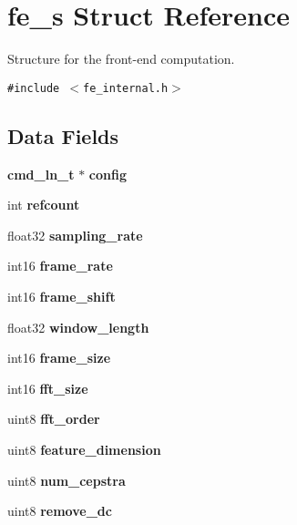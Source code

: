 \section{fe\_\-s Struct Reference}
\label{structfe__s}
Structure for the front-end computation.  


{\tt \#include $<$fe\_\-internal.h$>$}

\subsection*{Data Fields}
\begin{CompactItemize}
\item 
{\bf cmd\_\-ln\_\-t} $\ast$ \textbf{config}\label{structfe__s_be27cd07861a2f0042f5a83f3371d0fb}

\item 
int \textbf{refcount}\label{structfe__s_4cdf2f8b372cfddb38a48dd770450af9}

\item 
float32 \textbf{sampling\_\-rate}\label{structfe__s_f79879861c60083c1c0135c380bfe8e2}

\item 
int16 \textbf{frame\_\-rate}\label{structfe__s_23ca679cec8c0643dd1fa32b4e925f00}

\item 
int16 \textbf{frame\_\-shift}\label{structfe__s_62b189505f084007c3799faf3836b118}

\item 
float32 \textbf{window\_\-length}\label{structfe__s_e652f41503dd7b853bff8de89340703d}

\item 
int16 \textbf{frame\_\-size}\label{structfe__s_72b5838a48f3a10c8ba3917d245093d0}

\item 
int16 \textbf{fft\_\-size}\label{structfe__s_466b997c1f544043fb3ab6f2f89e97e7}

\item 
uint8 \textbf{fft\_\-order}\label{structfe__s_3783552280c06207510cbe576a76d1d9}

\item 
uint8 \textbf{feature\_\-dimension}\label{structfe__s_9c876fb2d9be5f3acaad06ddebcdc4fe}

\item 
uint8 \textbf{num\_\-cepstra}\label{structfe__s_05579b3906420cddd62fdf1ded7b63ce}

\item 
uint8 \textbf{remove\_\-dc}\label{structfe__s_c575bed8a61105f4302bd27246d4c33d}


\end{CompactItemize}
